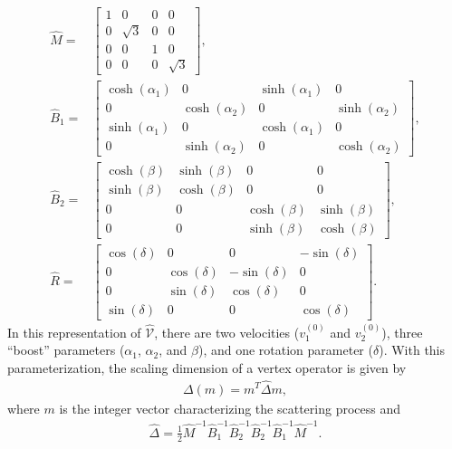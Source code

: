 \documentclass[aps,prx,amsmath,superscriptaddress,twocolumn,bibnotes,longbibliography,floatfix]{revtex4-2}
\begin{document}
	\begin{subequations}\label{Eq:M_B_matrices}
		\begin{align}
		\hat{M}=&\begin{bmatrix}
			1 & 0 & 0 & 0\\
			0 & \sqrt{3} & 0 & 0\\
			0 & 0 & 1 & 0\\
			0 & 0 & 0 & \sqrt{3}
		\end{bmatrix},\\
		\hat{B}_1=&\begin{bmatrix}
		\cosh(\alpha_1) & 0 & \sinh(\alpha_1) & 0\\
		0 & \cosh(\alpha_2) & 0 & \sinh(\alpha_2)\\
		\sinh(\alpha_1) & 0 & \cosh(\alpha_1) & 0\\
		0 & \sinh(\alpha_2) & 0 & \cosh(\alpha_2)
		\end{bmatrix},\\
		\hat{B}_2=&\begin{bmatrix}
			\cosh(\beta) & \sinh(\beta) & 0 & 0\\
			\sinh(\beta) & \cosh(\beta) & 0 & 0\\
			0 & 0 & \cosh(\beta) & \sinh(\beta)\\
			0 & 0 & \sinh(\beta) & \cosh(\beta)
		\end{bmatrix},\\
		\hat{R}=&\begin{bmatrix}
			\cos(\delta) & 0 & 0 & -\sin(\delta)\\
			0 & \cos(\delta) & -\sin(\delta) & 0\\
			0 & \sin(\delta) & \cos(\delta) & 0\\
			\sin(\delta) & 0 & 0 & \cos(\delta)
		\end{bmatrix}.
	\end{align}
	\end{subequations}
	In this representation of $\hat{\mathcal{V}}$, there are two velocities ($v_1^{(0)}$ and $v_2^{(0)}$), three ``boost'' parameters ($\alpha_1$, $\alpha_2$, and $\beta$), and one rotation parameter ($\delta$). With this parameterization, the scaling dimension of a vertex operator is given by
	\begin{align}\label{Eq:Scaling_dim_gen}
		\Delta(m)=m^T\hat{\Delta}m,
	\end{align}
	where $m$ is the integer vector characterizing the scattering process and
	\begin{align}\label{Eq:Delta_matrix}
		\hat{\Delta}=\frac{1}{2}\hat{M}^{-1}\hat{B}_1^{-1}\hat{B}_2^{-1}\hat{B}_2^{-1}\hat{B}_1^{-1}\hat{M}^{-1}.
	\end{align}
\end{document}
